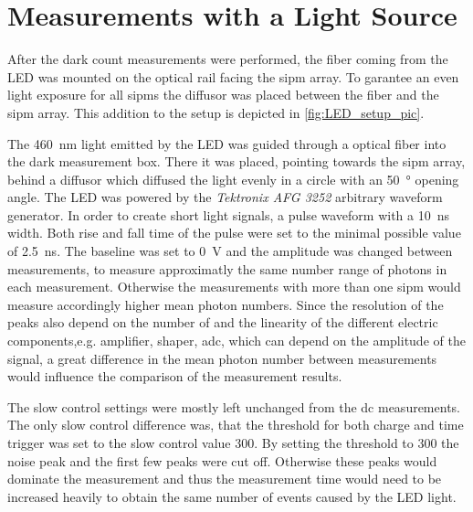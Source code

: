 


\FloatBarrier
\section{Measurements with a Light Source}
After the dark count measurements were performed, the fiber coming from the LED was mounted on the optical rail facing the \ac{sipm} array.
To garantee an even light exposure for all \ac{sipm}s the diffusor was placed between the fiber and the \ac{sipm} array.
This addition to the setup is depicted in \autoref{fig:LED_setup_pic}.

The \SI{460}{\nano\meter} light emitted by the LED was guided through a optical fiber into the dark measurement box.
There it was placed, pointing towards the \ac{sipm} array, behind a diffusor which diffused the light evenly in a circle with an \SI{50}{\degree} opening angle.
The LED was powered by the \textit{Tektronix AFG 3252} arbitrary waveform generator.
In order to create short light signals, a pulse waveform with a \SI{10}{\nano\second} width. 
Both rise and fall time of the pulse were set to the minimal possible value of \SI{2.5}{\nano\second}. 
The baseline was set to \SI{0}{\volt} and the amplitude was changed between measurements, to measure approximatly the same number range of photons in each measurement.
Otherwise the measurements with more than one \ac{sipm} would measure accordingly higher mean photon numbers.
Since the resolution of the \si{\pe} peaks also depend on the number of \si{\pe} and the linearity of the different electric components,e.g. amplifier, shaper, \ac{adc}, which can depend on the amplitude of the signal, a great difference in the mean photon number between measurements would influence the comparison of the measurement results.

The slow control settings were mostly left unchanged from the \ac{dc} measurements.
The only slow control difference was, that the threshold for both charge and time trigger was set to the slow control value 300.
By setting the threshold to 300 the noise peak and the first few \si{\pe} peaks were cut off. 
Otherwise these peaks would dominate the measurement and thus the measurement time would need to be increased heavily to obtain the same number of events caused by the LED light.


